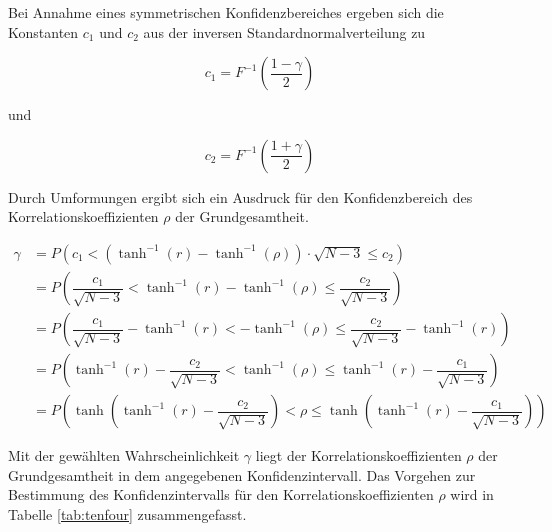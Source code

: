 \noindent Bei Annahme eines symmetrischen Konfidenzbereiches ergeben sich die Konstanten $c_{1}$ und $c_{2}$ aus der inversen Standardnormalverteilung zu 

\begin{equation}\label{eq:tenfourtyfive}
c_{1} =F^{-1} \left(\dfrac{1-\gamma }{2} \right)
\end{equation}

\noindent und

\begin{equation}\label{eq:tenfourtysix}
c_{2} =F^{-1} \left(\dfrac{1+\gamma }{2} \right)
\end{equation}

\noindent Durch Umformungen ergibt sich ein Ausdruck f\"{u}r den Konfidenzbereich des Korrelationskoeffizienten $\rho$ der Grundgesamtheit.

\begin{equation}\label{eq:tenfourtyseven}
\begin{split}
\gamma  & = P\left(c_{1} <\left(\tanh ^{-1} (r)-\tanh ^{-1} (\rho)\right)\cdot \sqrt{N-3} \le c_{2} \right) \\ 
& = P\left(\dfrac{c_{1} }{\sqrt{N-3} } <\tanh ^{-1} (r)-\tanh ^{-1} (\rho )\le \dfrac{c_{2}}{\sqrt{N-3}} \right) \\ 
& = P\left(\dfrac{c_{1} }{\sqrt{N-3} } -\tanh ^{-1} (r)<-\tanh ^{-1} (\rho)\le \dfrac{c_{2}}{\sqrt{N-3}} -\tanh ^{-1} (r)\right)\\ 
& =P\left(\tanh ^{-1} (r)-\dfrac{c_{2} }{\sqrt{N-3}} <\tanh ^{-1} (\rho)\le \tanh ^{-1} (r)-\dfrac{c_{1}}{\sqrt{N-3}} \right)\\ 
& = P\left(\tanh \left(\tanh ^{-1} (r)-\dfrac{c_{2} }{\sqrt{N-3}} \right)<\rho \le \tanh \left(\tanh ^{-1} (r)-\dfrac{c_{1}}{\sqrt{N-3}} \right)\right)
\end{split}
\end{equation}

\noindent Mit der gew\"{a}hlten Wahrscheinlichkeit $\gamma$ liegt der Korrelationskoeffizienten $\rho$ der Grundgesamtheit in dem angegebenen Konfidenzintervall. Das Vorgehen zur Bestimmung des Konfidenzintervalls f\"{u}r den Korrelationskoeffizienten $\rho$ wird in Tabelle \ref{tab:tenfour} zusammengefasst.

